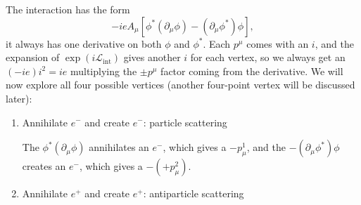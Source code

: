 \documentclass[11pt]{article}
\theoremstyle{definition}
\begin{document}
The interaction has the form
\begin{equation}
    -ieA_\mu [\phi^*(\partial_\mu\phi) - (\partial_\mu\phi^*)\phi],
\end{equation}
it always has one derivative on both $\phi$ and $\phi^*$. Each $p^\mu$ comes with an $i$, and the expansion of $\exp(i\mathcal{L}_\text{int})$ gives another $i$ for each vertex, so we always get an $(-ie)i^2 = ie$ multiplying the $\pm p^\mu$ factor coming from the derivative. We will now explore all four possible vertices (another four-point vertex will be discussed later):
\begin{enumerate}
    \item Annihilate $e^-$ and create $e^-$: particle scattering
    \begin{center}
    \end{center}
    The $\phi^*(\partial_\mu\phi)$ annihilates an $e^-$, which gives a $-p_\mu^1$, and the $-(\partial_\mu\phi^*)\phi$ creates an $e^-$, which gives a $-(+p_\mu^2)$.
    \item Annihilate $e^+$ and create $e^+$: antiparticle scattering
    \begin{center}
\end{center}
\end{enumerate}
\end{document}
